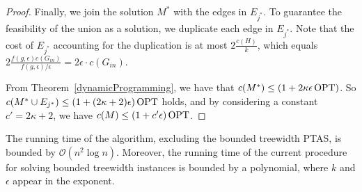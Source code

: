 \begin{proof}
    Finally, we join the solution \(M^\ast\) with the edges in \(E_{j^\ast}\). To guarantee the feasibility of the union as a solution, we duplicate each edge in \(E_{j^\ast}\). Note that the cost of \(E_{j^\ast}\) accounting for the duplication is at most \(2 \frac{c(H)}{k}\), which equals \(2 \frac{f(g, \epsilon) c(G_{in})}{f(g, \epsilon) / \epsilon} = 2 \epsilon \cdot c(G_{in})\).

    From Theorem~\ref{dynamicProgramming}, we have that \(c(M^\ast) \leq (1 + 2 \kappa \epsilon \operatorname{\textrm{OPT}})\). So \(c(M^\ast \cup E_{j^\ast}) \leq (1 + (2 \kappa + 2) \epsilon) \operatorname{\textrm{OPT}}\) holds, and by considering a constant \(c' = 2 \kappa + 2\), we have \(c(M) \leq (1 + c' \epsilon) \operatorname{\textrm{OPT}}\).

\end{proof}

The running time of the algorithm, excluding the bounded treewidth PTAS, is bounded by \(\mathcal{O}(n^2 \log n)\). Moreover, the running time of the current procedure for solving bounded treewidth instances is bounded by a polynomial, where \(k\) and \(\epsilon\) appear in the exponent.
